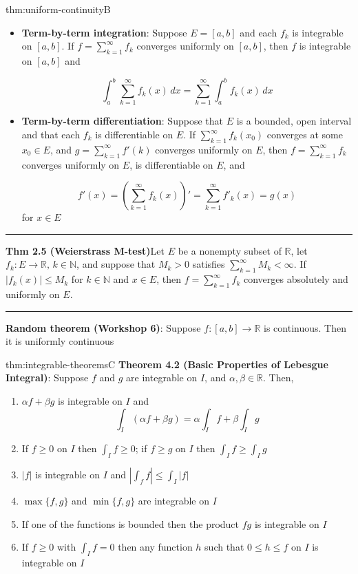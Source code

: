 \documentclass[landscape, 8pt]{extarticle}
\begin{document}
\begin{multicols}{3}
\begin{thm}{thm:uniform-continuity}{B}
\begin{itemize}
		\item \textbf{Term-by-term integration}: Suppose $E=[a,b]$ and each $f_{k}$ is integrable on $[a,b]$. If $f=\sum_{k=1}^{\infty} f_{k}$ converges uniformly on $[a,b]$, then $f$ is integrable on $[a,b]$ and

		\[\int_{a}^{b} \sum_{k=1}^{\infty} f_{k}(x) \, dx =\sum_{k=1}^{\infty} \int_{a}^{b} f_{k}(x) \, dx \]
		\item \textbf{Term-by-term differentiation}: Suppose that $E$ is a bounded, open interval and that each $f_{k}$ is differentiable on $E$. If $\sum_{k=1}^{\infty}f_{k}(x_{0})$ converges at some $x_{0}\in E$, and $g=\sum_{k=1}^{\infty}f'(k)$ converges uniformly on $E$, then $f= \sum_{k=1}^{\infty}f_{k}$ converges uniformly on $E$, is differentiable on $E$, and

		\[f'(x)=\left( \sum_{k=1}^{\infty} f_{k}(x) \right)'=\sum_{k=1}^{\infty} f'_{k}(x)=g(x)\]
		for $x\in E$

	\end{itemize}

	\noindent\rule{\textwidth}{0.2pt}

	\textbf{Thm 2.5 (Weierstrass M-test)}Let $E$ be a nonempty subset of $\mathbb{R}$, let $f_{k}: E\to \mathbb{R},\,k\in\mathbb{N}$, and suppose that $M_{k}>0$ satisfies $\sum_{k=1}^{\infty} M_{k}<\infty$. If $\lvert f_{k}(x) \rvert \le M_{k}$ for $k\in \mathbb{N}$ and $x\in E$,  then $f=\sum_{k=1}^{\infty}f_{k}$ converges absolutely and uniformly on $E$.

	\noindent\rule{\textwidth}{0.2pt}
	\textbf{Random theorem (Workshop 6)}: Suppose $f : [a,b]\to \mathbb{R}$ is continuous. Then it is uniformly continuous
\end{thm}

\begin{thm}{thm:integrable-theorems}{C}
	\vspace{-5pt}
	\textbf{Theorem 4.2 (Basic Properties of Lebesgue Integral)}: Suppose $f$ and $g$ are integrable on $I$, and $\alpha, \beta\in \mathbb{R}$. Then,
	\vspace{-5pt}
	\begin{enumerate}
		\setlength\itemsep{0em}
		\item $\alpha f + \beta g$ is integrable on $I$ and
		\[\int_{I} (\alpha f + \beta g)=\alpha\int_{I} f+\beta\int_{I} g\]
		\item If $f\ge 0$ on $I$ then $\int_{I}f\ge 0$; if $f\ge g$ on $I$ then $\int_{I}f\ge \int_{I}g$
		\item $\lvert f \rvert$ is integrable on $I$ and $\left\lvert  \int_{f}f  \right\rvert\le \int_{I}\lvert f \rvert$
		\item $\max\{f,g\}$ and $\min\{f,g\}$ are integrable on $I$
		\item If one of the functions is bounded then the product $fg$ is integrable on $I$
		\item If $f\ge 0$ with $\int_{I}f=0$ then any function $h$ such that $0\le h\le f$ on $I$ is integrable on $I$
	\end{enumerate}


\end{thm}
\end{multicols}
\end{document}
